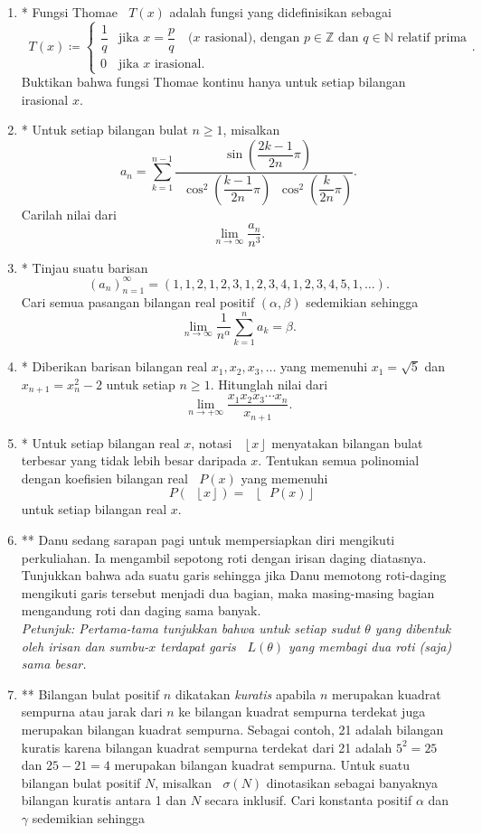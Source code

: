 \documentclass[12pt]{article}
\newcommand*\floor[1]{\mathop{}\!\left\lfloor{#1}\right\rfloor}
\newcommand*\func[2]{\mathop{}\!{#1}{\left({#2}\right)}}
\begin{document}
\begin{enumerate}[leftmargin=*]
		\item* Fungsi Thomae $ \func{T}{x} $ adalah fungsi yang didefinisikan sebagai
		\[
			\func{T}{x} \coloneqq	\begin{cases}
										\dfrac{1}{q}	& \text{jika }x=\dfrac{p}{q}\quad (x \text{ rasional), dengan } p \in \mathbb{Z} \text{ dan } q \in \mathbb{N} \text{ relatif prima} \\
										0				& \text{jika }x\text{ irasional.}
								\end{cases}.
		\]
		Buktikan bahwa fungsi Thomae kontinu hanya untuk setiap bilangan irasional $ x $.
		\item* Untuk setiap bilangan bulat $ n \geq 1 $, misalkan
		\[ a_{n} = \sum_{k = 1}^{n - 1}{\frac{\func{\sin}{\dfrac{2k - 1}{2n}\pi}}{\func{\cos^{2}}{\dfrac{k - 1}{2n}\pi}\func{\cos^{2}}{\dfrac{k}{2n}\pi}}}. \]
		Carilah nilai dari
		\[ \lim_{n \to \infty}{\frac{a_{n}}{n^{3}}}. \]
		\item* Tinjau suatu barisan
		\[ \left(a_{n}\right)_{n = 1}^{\infty} = \left(1, 1, 2, 1, 2, 3, 1, 2, 3, 4, 1, 2, 3, 4, 5, 1, \dots\right). \]
		Cari semua pasangan bilangan real positif $ \left(\alpha, \beta\right) $ sedemikian sehingga
		\[ \lim_{n \to \infty}{\frac{1}{n^{\alpha}}\sum_{k = 1}^{n}{a_{k}}} = \beta. \]
		\item* Diberikan barisan bilangan real $ x_{1}, x_{2}, x_{3}, \dots $ yang memenuhi $ x_{1} = \sqrt{5} $ dan $ x_{n + 1} = x_{n}^{2} - 2 $ untuk setiap $ n \geq 1 $. Hitunglah nilai dari
		\[ \lim_{n \to +\infty}{\frac{x_{1}x_{2}x_{3} \cdots x_{n}}{x_{n + 1}}}. \]
		\item* Untuk setiap bilangan real $ x $, notasi $ \floor{x} $ menyatakan bilangan bulat terbesar yang tidak lebih besar daripada $ x $. Tentukan semua polinomial dengan koefisien bilangan real $ \func{P}{x} $ yang memenuhi
		\[ \func{P}{\floor{x}} = \floor{\func{P}{x}} \]
		untuk setiap bilangan real $ x $.
		\item** Danu sedang sarapan pagi untuk mempersiapkan diri mengikuti perkuliahan. Ia mengambil sepotong roti dengan irisan daging diatasnya. Tunjukkan bahwa ada suatu garis sehingga jika Danu memotong roti-daging mengikuti garis tersebut menjadi dua bagian, maka masing-masing bagian mengandung roti dan daging sama banyak. \\
		\textit{Petunjuk: Pertama-tama tunjukkan bahwa untuk setiap sudut $ \theta $ yang dibentuk oleh irisan dan sumbu-$ x $ terdapat garis $ \func{L}{\theta} $ yang membagi dua roti (saja) sama besar.}
		\item** Bilangan bulat positif $ n $ dikatakan \textit{kuratis} apabila $ n $ merupakan kuadrat sempurna atau jarak dari $ n $ ke bilangan kuadrat sempurna terdekat juga merupakan bilangan kuadrat sempurna. Sebagai contoh, 21 adalah bilangan kuratis karena bilangan kuadrat sempurna terdekat dari 21 adalah $ 5^{2} = 25 $ dan $ 25 - 21 = 4 $ merupakan bilangan kuadrat sempurna. Untuk suatu bilangan bulat positif $ N $, misalkan $ \func{\sigma}{N} $ dinotasikan sebagai banyaknya bilangan kuratis antara 1 dan $ N $ secara inklusif. Cari konstanta positif $ \alpha $ dan $ \gamma $ sedemikian sehingga

\end{enumerate}
\end{document}

